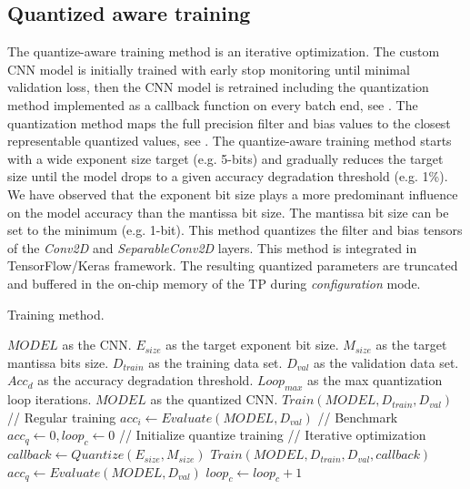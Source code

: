 \subsection{Quantized aware training}
The quantize-aware training method is an iterative optimization. The custom CNN model is initially trained with early stop monitoring until minimal validation loss, then the CNN model is retrained including the quantization method implemented as a callback function on every batch end, see . The quantization method maps the full precision filter and bias values to the closest representable quantized values, see . The quantize-aware training method starts with a wide exponent size target (e.g. 5-bits) and gradually reduces the target size until the model drops to a given accuracy degradation threshold (e.g. 1\%). We have observed that the exponent bit size plays a more predominant influence on the model accuracy than the mantissa bit size. The mantissa bit size can be set to the minimum (e.g. 1-bit). This method quantizes the filter and bias tensors of the \emph{Conv2D} and \emph{SeparableConv2D} layers. This method is integrated in TensorFlow/Keras framework. The resulting quantized parameters are truncated and buffered in the on-chip memory of the TP during \emph{configuration} mode.
\begin{algorithm}[h!]
	\label{alg:training}
	\caption{Training method.}
	\begin{algorithmic}
		\SetAlgoLined
		\renewcommand{\algorithmicrequire}{\textbf{input:}}
		\renewcommand{\algorithmicensure}{\textbf{output:}}
		\REQUIRE $MODEL$ as the CNN.
		\REQUIRE $E_{size}$ as the target exponent bit size.
		\REQUIRE $M_{size}$ as the target mantissa bits size.
		\REQUIRE $D_{train}$ as the training data set.
		\REQUIRE $D_{val}$ as the validation data set.
		\REQUIRE $Acc_d$ as the accuracy degradation threshold.
		\REQUIRE $Loop_{max}$ as the max quantization loop iterations.
		\ENSURE $MODEL$ as the quantized CNN.
		\STATE $Train(MODEL, D_{train}, D_{val})$ // Regular training
		\STATE $acc_i \gets Evaluate(MODEL, D_{val})$ // Benchmark
		\STATE $acc_q \gets 0, loop_c \gets 0$ // Initialize quantize training
		\STATE // Iterative optimization
		\STATE $callback \gets Quantize(E_{size}, M_{size})$
		\STATE $Train(MODEL, D_{train}, D_{val}, callback)$
		\STATE $acc_q \gets Evaluate(MODEL, D_{val})$
		\STATE $loop_c \gets loop_c + 1$
		\ENDWHILE
	\end{algorithmic}
\end{algorithm}
